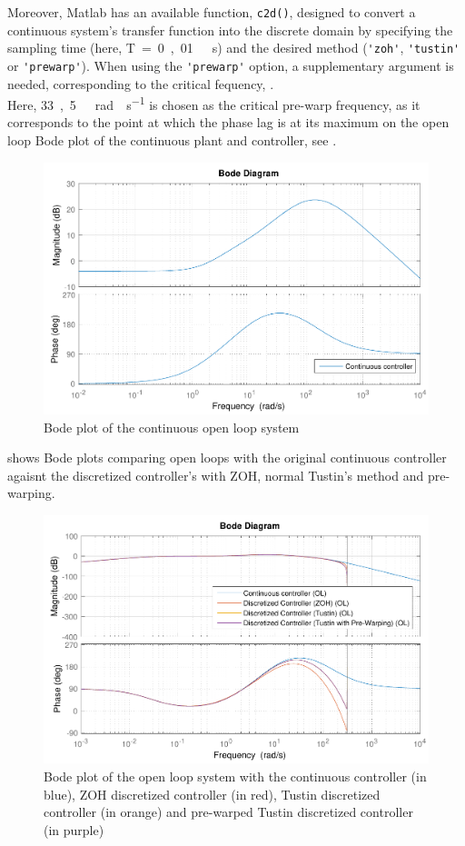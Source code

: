 Moreover, Matlab has an available function, \lstinline{c2d()}, designed to convert a continuous system's transfer function into the discrete domain by specifying the sampling time (here, \si{T = 0,01\ s}) and the desired method (\lstinline{'zoh'}, \lstinline{'tustin'} or \lstinline{'prewarp'}). When using the \lstinline{'prewarp'} option, a supplementary argument is needed, corresponding to the critical fequency, \cite{Matlabc2d}.\\
Here, \si{33,5\ rad \cdot s^{-1}} is chosen as the critical pre-warp frequency, as it corresponds to the point at which the phase lag is at its maximum on the open loop Bode plot of the continuous plant and controller, see .
%
\begin{figure}[H]
  \centering
  \includegraphics[scale=0.65]{figures/openLoopBadSISOController}
  \caption{Bode plot of the continuous open loop system}
  \label{fig:bodeOpenLoopContinuous}
\end{figure}
%
 shows Bode plots comparing open loops with the original continuous controller agaisnt the discretized controller's with ZOH, normal Tustin's method and pre-warping.
%
\begin{figure}[H]
  \centering
  \includegraphics[scale=.6]{figures/zohVsPrewarpVsNoPrewarpVsContinuousBodeOpenLoop}
  \caption{Bode plot of the open loop system with the continuous controller (in blue), ZOH discretized controller (in red), Tustin discretized controller (in orange) and pre-warped Tustin discretized controller (in purple)}
  \label{fig:bodePrewarpVsNoPrewarpVsContinuousOpenLoop}
\end{figure}
